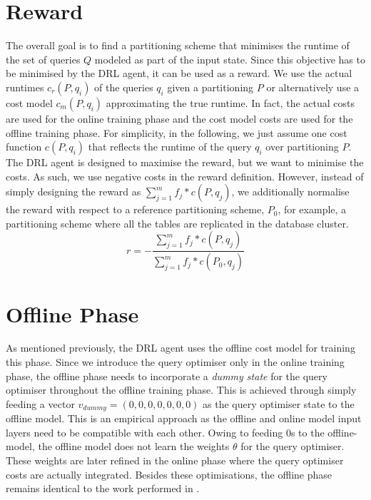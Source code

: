 \section{Reward}
The overall goal is to find a partitioning scheme that minimises the runtime of the set of queries $Q$ modeled as part of the input state. Since this objective has to be minimised by the DRL agent, it can be used as a reward. We use the actual runtimes $c_r(P,q_i)$ of the queries $q_i$ given a partitioning $P$ or alternatively use a cost model $c_m(P,q_i)$ approximating the true runtime. In fact, the actual costs are used for the online training phase and the cost model costs are used for the offline training phase. For simplicity, in the following, we just assume one cost function $c(P,q_i)$ that reflects the runtime of the query $q_i$ over partitioning $P$.
The DRL agent is designed to maximise the reward, but we want to minimise the costs. As such, we use negative costs in the reward definition. However, instead of simply designing the reward as $\sum^m_{j=1}f_j*c(P,q_j)$, we additionally normalise the reward with respect to a reference partitioning scheme, $P_0$, for example, a partitioning scheme where all the tables are replicated in the database cluster.
\begin{equation}
    r = - \frac{\sum^m_{j=1}f_j*c(P,q_j)}{\sum^m_{j=1}f_j*c(P_0,q_j)}
\end{equation}

\section{Offline Phase}
As mentioned previously, the DRL agent uses the offline cost model for training this phase. Since we introduce the query optimiser only in the online training phase, the offline phase needs to incorporate a \textit{dummy state} for the query optimiser throughout the offline training phase. This is achieved through simply feeding a vector $v_{dummy} = (0, 0, 0, 0, 0, 0, 0) $ as the query optimiser state to the offline model. This is an empirical approach as the offline and online model input layers need to be compatible with each other. Owing to feeding $0$s to the offline-model, the offline model does not learn the weights $\theta$ for the query optimiser. These weights are later refined in the online phase where the query optimiser costs are actually integrated. Besides these optimisations, the offline phase remains identical to the work performed in \cite{DBLP:conf/sigmod/HilprechtBR20}. 

